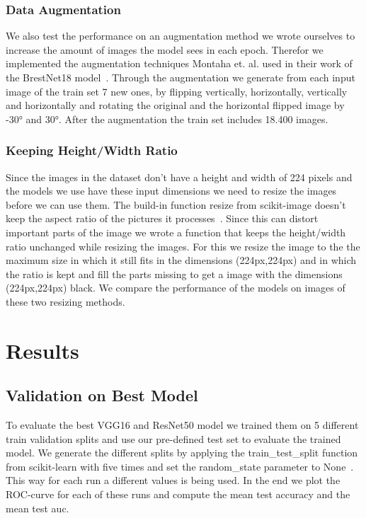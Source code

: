\documentclass[sn-mathphys,Numbered]{sn-jnl}%
\theoremstyle{thmstyleone}%
\theoremstyle{thmstyletwo}%
\theoremstyle{thmstylethree}%
\begin{document}
\subsubsection{Data Augmentation}\label{DataAugmentation}
We also test the performance on an augmentation method we wrote ourselves to increase the amount of images the model sees in each epoch. Therefor we implemented the augmentation techniques Montaha et. al. used in their work of the BrestNet18 model~\cite{Montaha2021}. Through the augmentation we generate from each input image of the train set 7 new ones, by flipping vertically, horizontally, vertically and horizontally and rotating the original and the horizontal flipped image by -30° and 30°. After the augmentation the train set includes 18.400 images.\\
\subsubsection{Keeping Height/Width Ratio}\label{HeightWidth}
Since the images in the dataset don't have a height and width of 224 pixels and the models we use have these input dimensions we need to resize the images before we can use them. The build-in function resize from scikit-image doesn't keep the aspect ratio of the pictures it processes~\cite{resize}. Since this can distort important parts of the image we wrote a function that keeps the height/width ratio unchanged while resizing the images. For this we resize the image to the the maximum size in which it still fits in the dimensions (224px,224px) and in which the ratio is kept and fill the parts missing to get a image with the dimensions (224px,224px) black. We compare the performance of the models on images of these two resizing methods.\\




\section{Results}\label{Results}
\subsection{Validation on Best Model}\label{CV_Results}
To evaluate the best VGG16 and ResNet50 model we trained them on 5 different train validation splits and use our pre-defined test set to evaluate the trained model. We generate the different splits by applying the train\_test\_split function from scikit-learn with five times and set the random\_state parameter to None~\cite{TTS}. This way for each run a different values is being used. In the end we plot the ROC-curve for each of these runs and compute the mean test accuracy and the mean test auc.\\
\end{document}
